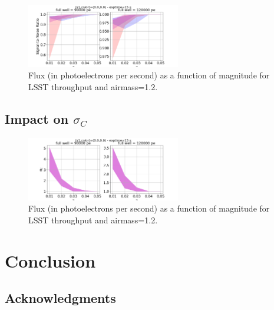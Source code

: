 \documentclass[\docopts]{\docclass}
\begin{document}
\begin{figure}[htbp]
\begin{center}
  \includegraphics[width=0.6\textwidth]{SNR_medium.png}
 \caption{Flux (in photoelectrons per second) as a function of magnitude for LSST throughput and airmass=1.2.}\label{fig:snrimpact}
\end{center}
\end{figure}


\subsection{Impact on $\sigma_C$}

\begin{figure}[htbp]
\begin{center}
  \includegraphics[width=0.6\textwidth]{sigmac_medium.png}
 \caption{Flux (in photoelectrons per second) as a function of magnitude for LSST throughput and airmass=1.2.}\label{fig:sigmacimpact}
\end{center}
\end{figure}



\section{Conclusion}
\label{sec:conclusion}




\subsection*{Acknowledgments}
\end{document}
